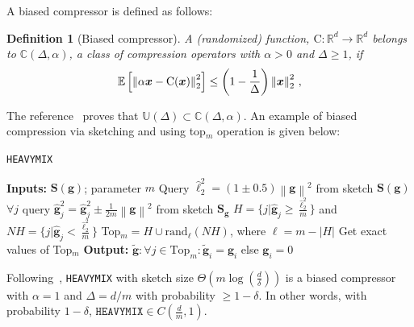 \documentclass{article}
\newtheorem{lemma}{Lemma}
\newtheorem{definition}{Definition}
\begin{document}
A biased compressor is defined as follows:
\begin{definition}[Biased compressor]
A (randomized) function,  ${\text{C}}:\mathbb{R}^{d}\rightarrow\mathbb{R}^{d}$ belongs to $\mathbb{C}(\Delta,\alpha)$, a class of compression operators with $\alpha>0$ and $\Delta\geq 1$, if
\begin{align}\notag
    \mathbb{E}\left[\left\|\alpha\boldsymbol{x}-{\text{C}}(\boldsymbol{x})\right\|^2_2\right]\leq \left(1-\frac{1}{\Delta}\right)\left\|\boldsymbol{x}\right\|^2_2\, ,
\end{align}
\end{definition}
The reference~\citep{horvath2020better} proves that $\mathbb{U}(\Delta)\subset\mathbb{C}(\Delta, \alpha)$.
An example of biased compression via sketching and using top$_m$ operation is given below:
\begin{algorithm}[H]
\caption{\texttt{HEAVYMIX}  }\label{alg:heavymix}
\begin{algorithmic}[1]
\STATE \textbf{Inputs:} $\mathbf{S}({\mathbf{g}})$; parameter $m$
\STATE Query $\hat{\ell}_2^2=\left(1\pm 0.5\right)\left\|\mathbf{g}\right\|^2$ from sketch $\mathbf{S}(\mathbf{g})$
\STATE $\forall j$ query $\hat{\mathbf{g}}_j^2=\hat{\mathbf{g}}_j^2\pm \frac{1}{2m}\left\|\mathbf{g}\right\|^2$ from sketch $\mathbf{S}_{\mathbf{g}}$
\STATE $H=\{j|\hat{\mathbf{g}}_j\geq \frac{\hat{\ell}_2^2}{m}\}$ and $NH=\{j|\hat{\mathbf{g}}_j<\frac{\hat{\ell}_2^2}{m}\}$
\STATE Top$_m=H\cup \text{rand}_\ell(NH)$, where $\ell=m-\left|H\right|$
\STATE Get exact values of Top$_m$ 
\STATE \textbf{Output:} $\tilde{\mathbf{g}}:\forall j\in\text{Top}_m:\tilde{\mathbf{g}}_{i}=\mathbf{g}_{i}$ else $ \mathbf{g}_{i}=0$
\end{algorithmic}
\end{algorithm}
Following~\citet{ivkin2019communication}, \texttt{HEAVYMIX} with sketch size $\Theta\left(m\log\left(\frac{d}{\delta}\right)\right)$ is a biased compressor with $\alpha=1$ and  $\Delta=d/m$ with probability $\geq1-\delta$. In other words, with probability $1-\delta$, $\texttt{HEAVYMIX}\in C(\frac{d}{m},1)$. 
\end{document}
